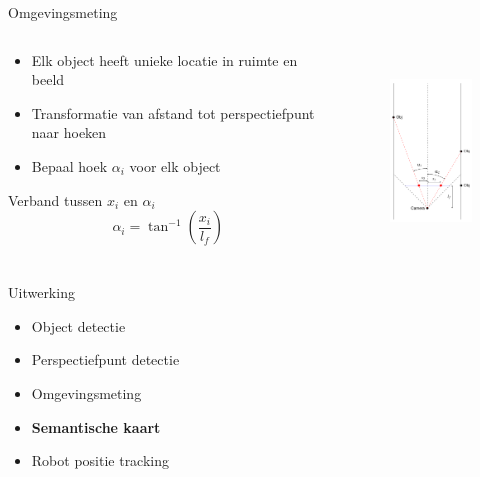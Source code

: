 \documentclass[11pt,t]{beamer}
\begin{document}
\begin{frame}[fragile]{Omgevingsmeting}
	\begin{columns}[t]
		\begin{column}{.5\textwidth}
			\begin{itemize}
				\item Elk object heeft unieke locatie in ruimte en beeld
				\item Transformatie van afstand tot perspectiefpunt naar hoeken
				\item Bepaal hoek $\alpha_i$ voor elk object
			\end{itemize}

			\begin{block}{Verband tussen $x_i$ en $\alpha_i$}
				\[
					\alpha_i = \tan^{-1}(\frac{x_i}{l_f})
				\]
			\end{block}
		\end{column}
		\begin{column}{.5\textwidth}
			\begin{figure}
				\centering
				\includegraphics[height=200px]{graphics/omgeving.png}
			\end{figure}
		\end{column}
	\end{columns}	
\end{frame}

%
%
\begin{frame}[fragile]{Uitwerking}
	\begin{itemize}
		\item Object detectie
		\item Perspectiefpunt detectie
		\item Omgevingsmeting
		\item \textbf{Semantische kaart}
		\item Robot positie tracking
	\end{itemize}
\end{frame}
\end{document}
